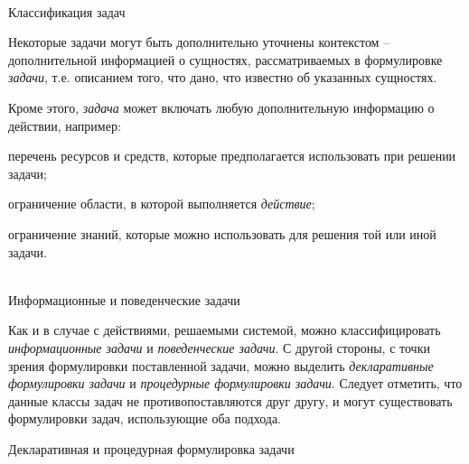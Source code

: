\begin{frame}{\\Классификация задач}
    \topline
	\justifying
 
    \bigskip
    
    Некоторые задачи могут быть дополнительно уточнены контекстом -- дополнительной информацией о сущностях, рассматриваемых в формулировке \textit{задачи}, т.е. описанием того, что дано, что известно об указанных сущностях.\\
    \bigskip
    
    Кроме этого, \textit{задача} может включать любую дополнительную информацию о действии, например:
    \begin{textitemize}
        \item перечень ресурсов и средств, которые предполагается использовать при решении задачи;
        \item ограничение области, в которой выполняется \textit{действие};
        \item ограничение знаний, которые можно использовать для решения той или иной задачи.
    \end{textitemize}
\end{frame}

\begin{frame}{\\Информационные и поведенческие задачи}
	\topline
	\justifying

    Как и в случае с действиями, решаемыми системой, можно классифицировать \textit{информационные задачи} и \textit{поведенческие задачи}. 
    С другой стороны, с точки зрения формулировки поставленной задачи, можно выделить \textit{декларативные формулировки задачи} и \textit{процедурные формулировки задачи}. Следует отметить, что данные классы задач не противопоставляются друг другу, и могут существовать формулировки задач, использующие оба подхода.
\end{frame}

\begin{frame}{Декларативная и процедурная формулировка задачи}
	\topline
	\justifying
     
    \begin{SCn}
    \end{SCn}
\end{frame}

